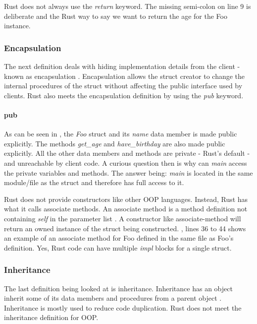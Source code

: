 \documentclass[a4paper,10pt]{article}
\begin{document}
\begin{notebox}
  Rust does not always use the \textit{return} keyword.
  The missing semi-colon on line 9 is deliberate and the Rust way to say we want to return the age for the Foo instance.
\end{notebox}

\subsubsection{Encapsulation}
The next definition deals with hiding implementation details from the client - known as encapsulation \cite{klabnik_2019_01, meyer_97_01}.
Encapsulation allows the struct creator to change the internal procedures of the struct without affecting the public interface used by clients.
Rust also meets the encapsulation definition by using the \textit{pub} keyword.

\paragraph{pub}
As can be seen in , the \textit{Foo} struct and its \textit{name} data member is made public explicitly.
The methods \textit{get\_age} and \textit{have\_birthday} are also made public explicitly.
All the other data members and methods are private - Rust's default - and unreachable by client code.
A curious question then is why can \textit{main} access the private variables and methods.
The answer being: \textit{main} is located in the same module/file as the struct and therefore has full access to it.

\begin{notebox}
  Rust does not provide constructors like other OOP languages.
  Instead, Rust has what it calls associate methods.
  An associate method is a method definition not containing \textit{self} in the parameter list \cite{klabnik_2019_01}.
  A constructor like associate-method will return an owned instance of the struct being constructed.
  , lines 36 to 44 shows an example of an associate method for Foo defined in the same file as Foo's definition.
  Yes, Rust code can have multiple \textit{impl} blocks for a single struct.
\end{notebox}

\subsubsection{Inheritance}
The last definition being looked at is inheritance.
Inheritance has an object inherit some of its data members and procedures from a parent object \cite{meyer_97_01, stefik_85_01, gamma_94_01}.
Inheritance is mostly used to reduce code duplication.
Rust does not meet the inheritance definition for OOP.
\end{document}
